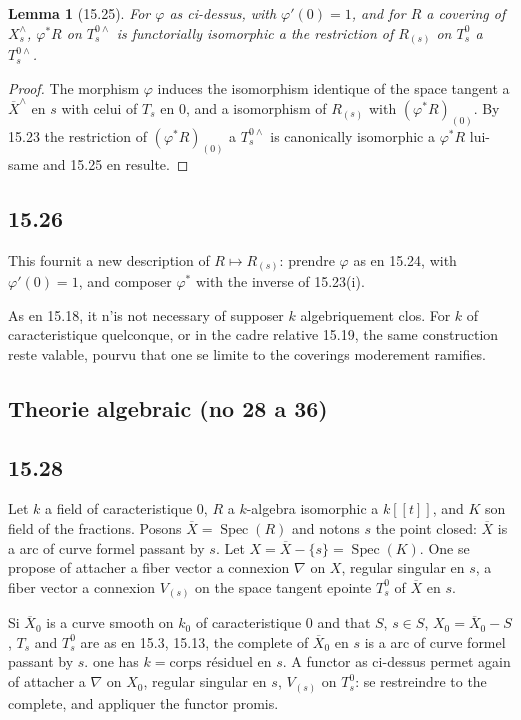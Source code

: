\documentclass[12pt,a4paper]{article}
\theoremstyle{plain}
\newtheorem{lemma}[theorem]{Lemma}
\theoremstyle{definition}
\theoremstyle{remark}
\DeclareMathOperator{\Spec}{Spec}
\begin{document}
\begin{lemma}[15.25]
For $\varphi$ as ci-dessus, with $\varphi'(0) = 1$, and for $R$ a covering of $X_s^\wedge$, $\varphi^* R$ on $T_s^{0\wedge}$ is functorially isomorphic a the restriction of $R_{(s)}$ on $T_s^0$ a $T_s^{0\wedge}$.
\end{lemma}

\begin{proof}
The morphism $\varphi$ induces the isomorphism identique of the space tangent a $\overline{X}^\wedge$ en $s$ with celui of $T_s$ en $0$, and a isomorphism of $R_{(s)}$ with $(\varphi^* R)_{(0)}$. By 15.23 the restriction of $(\varphi^* R)_{(0)}$ a $T_s^{0\wedge}$ is canonically isomorphic a $\varphi^* R$ lui-same and 15.25 en resulte.
\end{proof}

\subsection*{15.26}

This fournit a new description of $R \mapsto R_{(s)}$: prendre $\varphi$ as en 15.24, with $\varphi'(0) = 1$, and composer $\varphi^*$ with the inverse of 15.23(i).

As en 15.18, it n'is not necessary of supposer $k$ algebriquement clos. For $k$ of caracteristique quelconque, or in the cadre relative 15.19, the same construction reste valable, pourvu that one se limite to the coverings moderement ramifies.


\subsection*{Theorie algebraic (no 28 a 36)}

\subsection*{15.28}

Let $k$ a field of caracteristique $0$, $R$ a $k$-algebra isomorphic a $k[[t]]$, and $K$ son field of the fractions. Posons $\overline{X} = \Spec(R)$ and notons $s$ the point closed: $\overline{X}$ is a arc of curve formel passant by $s$. Let $X = \overline{X} - \{s\} = \Spec(K)$. One se propose of attacher a fiber vector a connexion $\nabla$ on $X$, regular singular en $s$, a fiber vector a connexion $V_{(s)}$ on the space tangent epointe $T_s^0$ of $\overline{X}$ en $s$.

Si $\overline{X}_0$ is a curve smooth on $k_0$ of caracteristique $0$ and that $S$, $s \in S$, $X_0 = \overline{X}_0 - S$, $T_s$ and $T_s^0$ are as en 15.3, 15.13, the complete of $\overline{X}_0$ en $s$ is a arc of curve formel passant by $s$. one has $k = \text{corps résiduel en } s$. A functor as ci-dessus permet again of attacher a $\nabla$ on $X_0$, regular singular en $s$, $V_{(s)}$ on $T_s^0$: se restreindre to the complete, and appliquer the functor promis.
\end{document}
